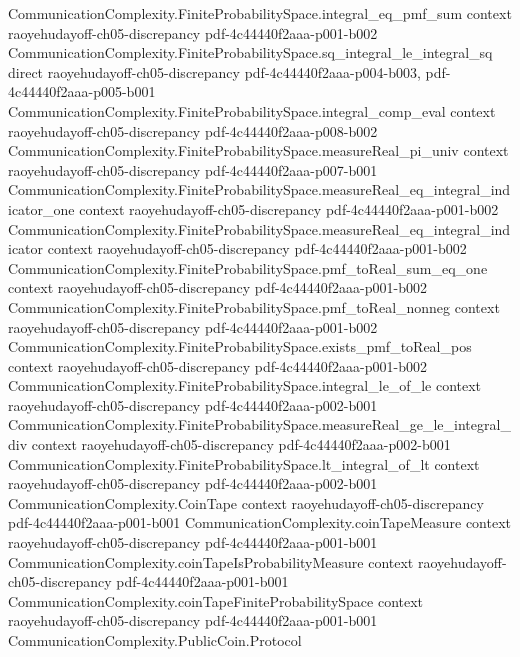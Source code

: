 \begin{lemma}
\proofstep
  {CommunicationComplexity.FiniteProbabilitySpace.integral_eq_pmf_sum}
  {context}
  {raoyehudayoff-ch05-discrepancy}
  {pdf-4c44440f2aaa-p001-b002}
\proofstep
  {CommunicationComplexity.FiniteProbabilitySpace.sq_integral_le_integral_sq}
  {direct}
  {raoyehudayoff-ch05-discrepancy}
  {pdf-4c44440f2aaa-p004-b003,
    pdf-4c44440f2aaa-p005-b001}
\proofstep
  {CommunicationComplexity.FiniteProbabilitySpace.integral_comp_eval}
  {context}
  {raoyehudayoff-ch05-discrepancy}
  {pdf-4c44440f2aaa-p008-b002}
\proofstep
  {CommunicationComplexity.FiniteProbabilitySpace.measureReal_pi_univ}
  {context}
  {raoyehudayoff-ch05-discrepancy}
  {pdf-4c44440f2aaa-p007-b001}
\proofstep
  {CommunicationComplexity.FiniteProbabilitySpace.measureReal_eq_integral_indicator_one}
  {context}
  {raoyehudayoff-ch05-discrepancy}
  {pdf-4c44440f2aaa-p001-b002}
\proofstep
  {CommunicationComplexity.FiniteProbabilitySpace.measureReal_eq_integral_indicator}
  {context}
  {raoyehudayoff-ch05-discrepancy}
  {pdf-4c44440f2aaa-p001-b002}
\proofstep
  {CommunicationComplexity.FiniteProbabilitySpace.pmf_toReal_sum_eq_one}
  {context}
  {raoyehudayoff-ch05-discrepancy}
  {pdf-4c44440f2aaa-p001-b002}
\proofstep
  {CommunicationComplexity.FiniteProbabilitySpace.pmf_toReal_nonneg}
  {context}
  {raoyehudayoff-ch05-discrepancy}
  {pdf-4c44440f2aaa-p001-b002}
\proofstep
  {CommunicationComplexity.FiniteProbabilitySpace.exists_pmf_toReal_pos}
  {context}
  {raoyehudayoff-ch05-discrepancy}
  {pdf-4c44440f2aaa-p001-b002}
\proofstep
  {CommunicationComplexity.FiniteProbabilitySpace.integral_le_of_le}
  {context}
  {raoyehudayoff-ch05-discrepancy}
  {pdf-4c44440f2aaa-p002-b001}
\proofstep
  {CommunicationComplexity.FiniteProbabilitySpace.measureReal_ge_le_integral_div}
  {context}
  {raoyehudayoff-ch05-discrepancy}
  {pdf-4c44440f2aaa-p002-b001}
\proofstep
  {CommunicationComplexity.FiniteProbabilitySpace.lt_integral_of_lt}
  {context}
  {raoyehudayoff-ch05-discrepancy}
  {pdf-4c44440f2aaa-p002-b001}
\proofstep
  {CommunicationComplexity.CoinTape}
  {context}
  {raoyehudayoff-ch05-discrepancy}
  {pdf-4c44440f2aaa-p001-b001}
\proofstep
  {CommunicationComplexity.coinTapeMeasure}
  {context}
  {raoyehudayoff-ch05-discrepancy}
  {pdf-4c44440f2aaa-p001-b001}
\proofstep
  {CommunicationComplexity.coinTapeIsProbabilityMeasure}
  {context}
  {raoyehudayoff-ch05-discrepancy}
  {pdf-4c44440f2aaa-p001-b001}
\proofstep
  {CommunicationComplexity.coinTapeFiniteProbabilitySpace}
  {context}
  {raoyehudayoff-ch05-discrepancy}
  {pdf-4c44440f2aaa-p001-b001}
\proofstep
  {CommunicationComplexity.PublicCoin.Protocol}

\end{lemma}
